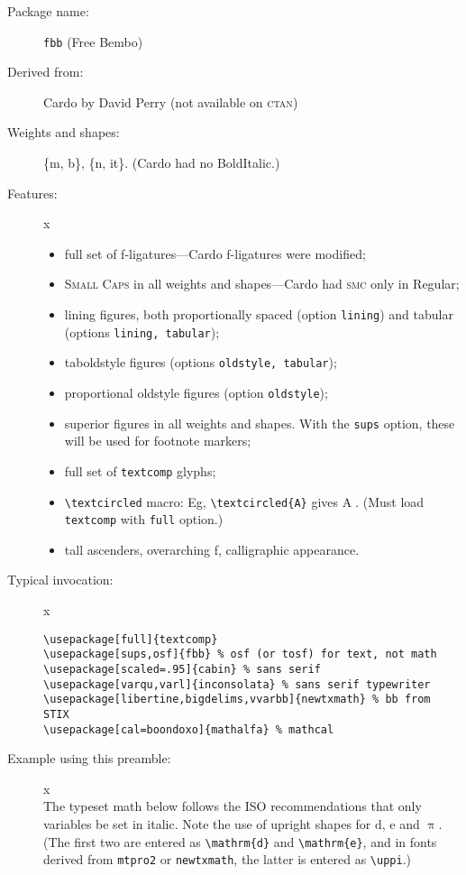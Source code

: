 \documentclass{article}
\def\Pr{\ensuremath{\mathbb{P}}}
\def\d{\mathrm{d}}
\begin{document}
\thispagestyle{empty}
\begin{description}
\item[Package name:] {\tt fbb} (Free Bembo)
\item[Derived from:] Cardo by David Perry (not available on \textsc{ctan})
\item[Weights and shapes:]  \{m, b\}, \{n, it\}. (Cardo had no BoldItalic.)
\item[Features:]{\color{white}x}\\[-15pt]  
\begin{itemize}
\item
full set of f-ligatures---Cardo f-ligatures were modified;
\item \textsc{Small Caps} in all weights and shapes---Cardo had \textsc{smc} only in Regular;
\item lining figures, both proportionally spaced (option {\tt lining}) and tabular (options {\tt lining, tabular});
\item taboldstyle figures  (options {\tt oldstyle, tabular});
\item proportional oldstyle figures  (option {\tt oldstyle});
\item superior figures  in all weights and shapes. With the {\tt sups} option, these will be used for footnote markers;
\item full set of {\tt textcomp} glyphs; 
\item \verb|\textcircled| macro: Eg, \verb|\textcircled{A}| gives \textcircled{A}. (Must load {\tt textcomp} with {\tt full} option.)
\item tall ascenders, overarching f, calligraphic appearance. 
\end{itemize}
\item[Typical invocation:]{\color{white}x}
\begin{verbatim}
\usepackage[full]{textcomp}
\usepackage[sups,osf]{fbb} % osf (or tosf) for text, not math
\usepackage[scaled=.95]{cabin} % sans serif
\usepackage[varqu,varl]{inconsolata} % sans serif typewriter
\usepackage[libertine,bigdelims,vvarbb]{newtxmath} % bb from STIX
\usepackage[cal=boondoxo]{mathalfa} % mathcal
\end{verbatim}
\item[Example using this preamble:]{\color{white}x}\\[6pt]
\lipsum[1]
\def\Pr{\ensuremath{\mathbb{P}}}
\def\d{\mathrm{d}}
The typeset math below follows the ISO recommendations that only variables
be set in italic. Note the use of upright shapes for $\d$, $\mathrm{e}$
and $\uppi$. (The first two are entered as \verb|\mathrm{d}| and
\verb|\mathrm{e}|, and in fonts derived from {\tt mtpro2} or {\tt newtxmath},
 the latter is entered as \verb|\uppi|.)


\end{description}
\end{document}
